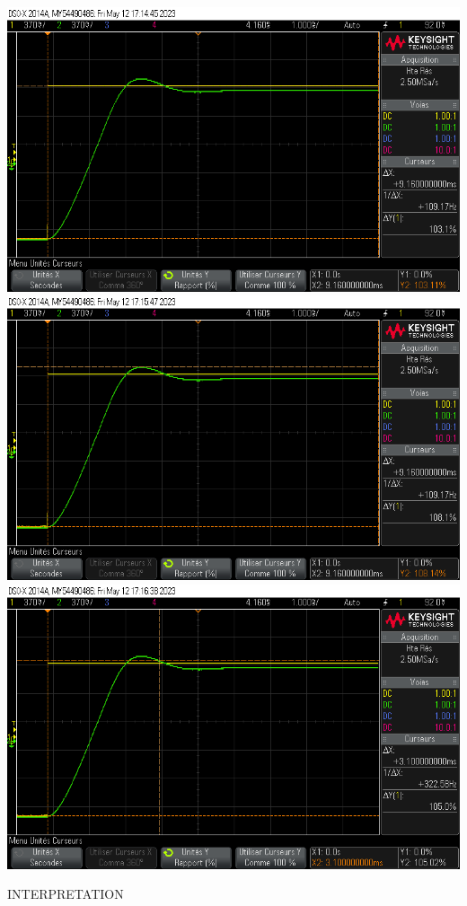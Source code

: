 \documentclass[12pt]{article}
\begin{document}
\begin{center}
    \includegraphics[width = 18 cm]{TP3/Syst_1/P/k27_2_es.png}
    \includegraphics[width = 18 cm]{TP3/Syst_1/P/k27_2_dep.png}
    \includegraphics[width = 18 cm]{TP3/Syst_1/P/k27_2_tr.png}
\end{center}
\large INTERPRETATION
\end{document}
